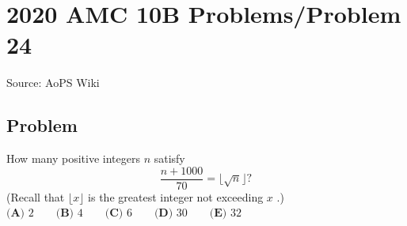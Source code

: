 \documentclass[12pt]{article}
\begin{document}
\section*{{2020 AMC 10B Problems/Problem 24}}
Source: AoPS Wiki

\subsection*{Problem}
How many positive integers $n$ satisfy \[\dfrac{n+1000}{70} = \lfloor \sqrt{n} \rfloor?\] (Recall that $\lfloor x\rfloor$ is the greatest integer not exceeding $x$ .) $\textbf{(A) } 2 \qquad\textbf{(B) } 4 \qquad\textbf{(C) } 6 \qquad\textbf{(D) } 30 \qquad\textbf{(E) } 32$
\end{document}
